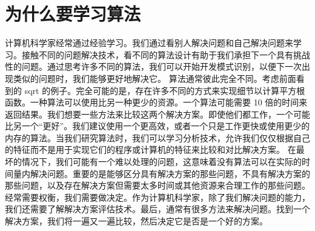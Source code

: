 \section{为什么要学习算法}

计算机科学家经常通过经验学习。我们通过看别人解决问题和自己解决问题来学习。接触不同的问题解决技术，看不同的算法设计有助于我们承担下一个具有挑战性的问题。通过思考许多不同的算法，我们可以开始开发模式识别，以便下一次出现类似的问题时，我们能够更好地解决它。
算法通常彼此完全不同。考虑前面看到的 sqrt 的例子。完全可能的是，存在许多不同的方式来实现细节以计算平方根函数。一种算法可以使用比另一种更少的资源。一个算法可能需要 10 倍的时间来返回结果。我们想要一些方法来比较这两个解决方案。即使他们都工作，一个可能比另一个“更好”。我们建议使用一个更高效，或者一个只是工作更快或使用更少的内存的算法。当我们研究算法时，我们可以学习分析技术，允许我们仅仅根据自己的特征而不是用于实现它们的程序或计算机的特征来比较和对比解决方案。
在最坏的情况下，我们可能有一个难以处理的问题，这意味着没有算法可以在实际的时间量内解决问题。重要的是能够区分具有解决方案的那些问题，不具有解决方案的那些问题，以及存在解决方案但需要太多时间或其他资源来合理工作的那些问题。
经常需要权衡，我们需要做决定。作为计算机科学家，除了我们解决问题的能力，我们还需要了解解决方案评估技术。最后，通常有很多方法来解决问题。找到一个解决方案，我们将一遍又一遍比较，然后决定它是否是一个好的方案。
